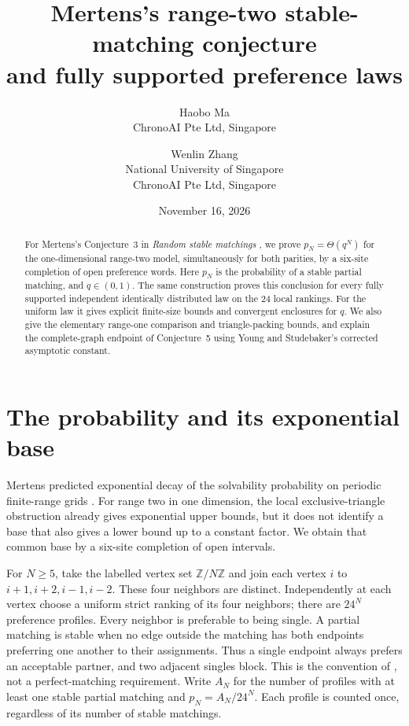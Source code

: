 \documentclass[11pt]{article}
\title{Mertens's range-two stable-matching conjecture\protect\\and fully supported preference laws}
\author{Haobo Ma\\\small ChronoAI Pte Ltd, Singapore
\and Wenlin Zhang\\\small National University of Singapore\\\small ChronoAI Pte Ltd, Singapore}
\date{November 16, 2026}
\newcommand{\Z}{\mathbb Z}
\begin{document}
\maketitle
\begin{abstract}
For Mertens's Conjecture~3 in \emph{Random stable matchings}
\cite[Section~3.2, equation~(15), p.~7; arXiv:cond-mat/0509221v2]{mertens2005},
we prove $p_N=\Theta(q^N)$ for the one-dimensional range-two model,
simultaneously for both parities, by a six-site completion of open
preference words. Here $p_N$ is the probability of a stable partial
matching, and $q\in(0,1)$. The same construction proves this conclusion
for every fully supported independent identically distributed law on the
24 local rankings. For the uniform law it gives explicit finite-size
bounds and convergent enclosures for $q$. We also give the elementary
range-one comparison and triangle-packing bounds, and explain the
complete-graph endpoint of Conjecture~5 using Young and Studebaker's
corrected asymptotic constant.
\end{abstract}

\section{The probability and its exponential base}
Mertens predicted exponential decay of the solvability probability on
periodic finite-range grids \cite[Conjecture~3]{mertens2005}.
For range two in one dimension, the local exclusive-triangle obstruction
already gives exponential upper bounds, but it does not identify a base
that also gives a lower bound up to a constant factor. We obtain that
common base by a six-site completion of open intervals.

For $N\geq5$, take the labelled vertex set $\Z/N\Z$ and join each vertex
$i$ to $i+1,i+2,i-1,i-2$. These four neighbors are distinct. Independently
at each vertex choose a uniform strict ranking of its four neighbors;
there are $24^N$ preference profiles. Every neighbor is preferable to
being single. A partial matching is stable when no edge outside the
matching has both endpoints preferring one another to their assignments.
Thus a single endpoint always prefers an acceptable partner, and two
adjacent singles block. This is the convention of
\cite[Section~2]{mertens2005}, not a perfect-matching requirement.
Write $A_N$ for the number of profiles with at least one stable partial
matching and $p_N=A_N/24^N$. Each profile is counted once, regardless of
its number of stable matchings.
\end{document}
